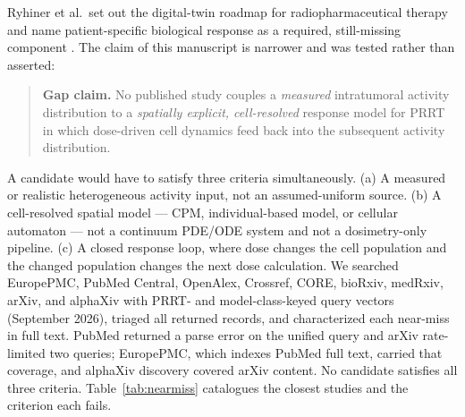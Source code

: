\documentclass[11pt]{article}
\begin{document}
Ryhiner et al.\ set out the digital-twin roadmap for radiopharmaceutical therapy and name
patient-specific biological response as a required, still-missing component
\cite{ryhiner2025tdt}. The claim of this manuscript is narrower and was tested rather than
asserted:

\begin{quote}
\textbf{Gap claim.} No published study couples a \emph{measured} intratumoral activity
distribution to a \emph{spatially explicit, cell-resolved} response model for PRRT in which
dose-driven cell dynamics feed back into the subsequent activity distribution.
\end{quote}

A candidate would have to satisfy three criteria simultaneously. (a) A measured or realistic heterogeneous activity
input, not an assumed-uniform source. (b) A cell-resolved spatial model --- CPM, individual-based model, or cellular
automaton --- not a continuum PDE/ODE system and not a dosimetry-only pipeline. (c) A closed response loop, where dose
changes the cell population and the changed population changes the next dose calculation. We
searched EuropePMC, PubMed Central, OpenAlex, Crossref, CORE, bioRxiv, medRxiv, arXiv, and
alphaXiv with PRRT- and model-class-keyed query vectors (September 2026), triaged all
returned records, and characterized each near-miss in full text. PubMed returned a parse
error on the unified query and arXiv rate-limited two queries; EuropePMC, which indexes
PubMed full text, carried that coverage, and alphaXiv discovery covered arXiv content. No
candidate satisfies all three criteria. Table~\ref{tab:nearmiss} catalogues the closest
studies and the criterion each fails.
\end{document}
